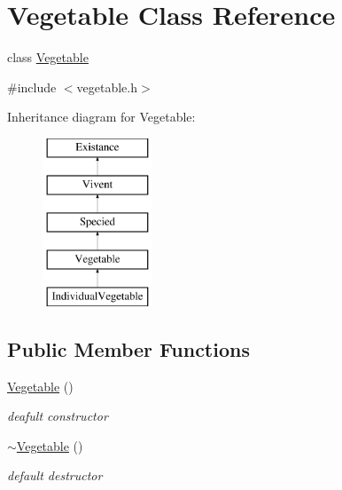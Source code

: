 \hypertarget{classVegetable}{
\section{Vegetable Class Reference}
\label{classVegetable}
}


class \hyperlink{classVegetable}{Vegetable}  




{\ttfamily \#include $<$vegetable.h$>$}

Inheritance diagram for Vegetable:\begin{figure}[H]
\begin{center}
\leavevmode
\includegraphics[height=5.000000cm]{classVegetable}
\end{center}
\end{figure}
\subsection*{Public Member Functions}
\begin{DoxyCompactItemize}
\item 
\hypertarget{classVegetable_a1f35f51f2f825b67f6db25ee3e228b47}{
\hyperlink{classVegetable_a1f35f51f2f825b67f6db25ee3e228b47}{Vegetable} ()}
\label{classVegetable_a1f35f51f2f825b67f6db25ee3e228b47}

\begin{DoxyCompactList}\small\item\em deafult constructor \end{DoxyCompactList}\item 
\hypertarget{classVegetable_a310e8097b46d2788d9da6adf08230180}{
\hyperlink{classVegetable_a310e8097b46d2788d9da6adf08230180}{$\sim$Vegetable} ()}
\label{classVegetable_a310e8097b46d2788d9da6adf08230180}

\begin{DoxyCompactList}\small\item\em default destructor \end{DoxyCompactList}\end{DoxyCompactItemize}


